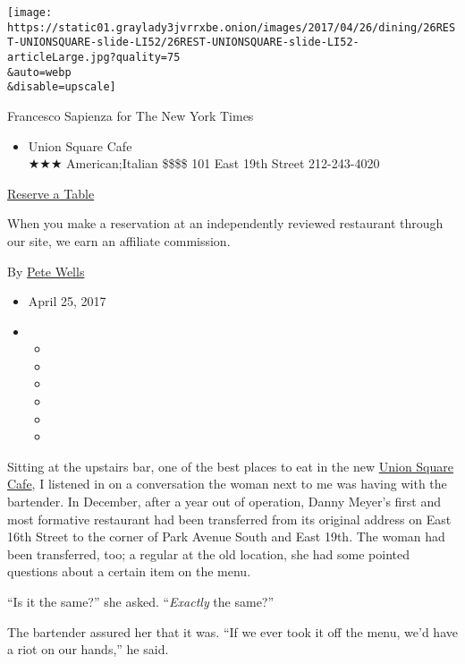 \texttt{[image: https://static01.graylady3jvrrxbe.onion/images/2017/04/26/dining/26REST-UNIONSQUARE-slide-LI52/26REST-UNIONSQUARE-slide-LI52-articleLarge.jpg?quality=75\\\&auto=webp\\\&disable=upscale]}

Francesco Sapienza for The New York Times

\begin{itemize}
\tightlist
\item
  Union Square Cafe\\
  ★★★ American;Italian \$\$\$\$ 101 East 19th Street 212-243-4020
\end{itemize}

\href{https://resy.com/cities/ny/union-square-cafe?utm_source=nyt\&utm_medium=restoprofile\&utm_campaign=affiliates\&aff_id=c1fe784}{Reserve
a Table}

When you make a reservation at an independently reviewed restaurant
through our site, we earn an affiliate commission.

By \href{http://www.nytimes3xbfgragh.onion/by/pete-wells}{Pete Wells}

\begin{itemize}
\item
  April 25, 2017
\item
  \begin{itemize}
  \item
  \item
  \item
  \item
  \item
  \item
  \end{itemize}
\end{itemize}

Sitting at the upstairs bar, one of the best places to eat in the new
\href{http://www.unionsquarecafe.com/}{Union Square Cafe}, I listened in
on a conversation the woman next to me was having with the bartender. In
December, after a year out of operation, Danny Meyer's first and most
formative restaurant had been transferred from its original address on
East 16th Street to the corner of Park Avenue South and East 19th. The
woman had been transferred, too; a regular at the old location, she had
some pointed questions about a certain item on the menu.

``Is it the same?'' she asked. ``\emph{Exactly} the same?''

The bartender assured her that it was. ``If we ever took it off the
menu, we'd have a riot on our hands,'' he said.

